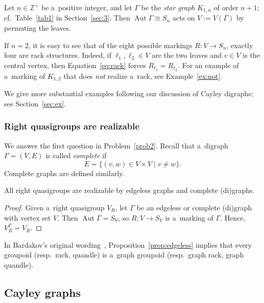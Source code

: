 \documentclass{jonasart}
\DeclareMathOperator{\Aut}{Aut}
\newcommand{\Z}{\mathbb{Z}}
\begin{document}
	\begin{example}
		Let $n\in\Z^+$ be a~positive integer, and let $\Gamma$ be the \emph{star graph} $K_{1,n}$ of order $n+1$; cf.\ Table~\ref{tab1} in Section~\ref{sec:3}. Then $\Aut \Gamma\cong S_n$ acts on $V:=V(\Gamma)$ by permuting the leaves.

		If $n=2$, it is easy to see that of the eight possible markings $R:V\to S_n$, exactly four are rack structures. Indeed, if $\ell_1,\ell_2\in V$ are the two leaves and $v\in V$ is the central vertex, then Equation~\eqref{eq:rack} forces $R_{\ell_1}=R_{\ell_2}$. For an example of a~marking of $K_{1,2}$ that does \emph{not} realize a~rack, see Example~\ref{ex:not}.
	\end{example}

	We give more substantial examples following our discussion of Cayley digraphs; see Section~\ref{sec:ex}.

	\subsubsection{Right quasigroups are realizable}
    
	We answer the first question in Problem~\ref{prob2}. Recall that a~digraph $\Gamma=(V,E)$ is called \emph{complete} if
	\[
		E =\{(v,w)\in V\times V\mid v\neq w\}.
	\]
	Complete graphs are defined similarly.
    
	\begin{proposition}\label{prop:edgeless}
		All right quasigroups are realizable by edgeless graphs and complete \textup{(}di\textup{)}graphs.
	\end{proposition}

	\begin{proof}
		Given a~right quasigroup $V_R$, let $\Gamma$ be an edgeless or complete (di)graph with vertex set $V$. Then $\Aut\Gamma=S_V$, so $R:V\to S_V$ is a~marking of $\Gamma$. Hence, $V_R^\Gamma=V_R$.
	\end{proof}

	\begin{remark}
		In Bardakov's original wording~\cite{bardakov}, Proposition~\ref{prop:edgeless} implies that every groupoid (resp.\ rack, quandle) is a~graph groupoid (resp.\ graph rack, graph quandle).
	\end{remark}
    
	\subsection{Cayley graphs}
    
\end{document}
